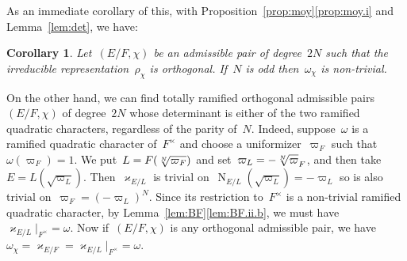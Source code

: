 \documentclass[12pt]{amsart}
\newcommand{\N}{\operatorname{N}}
\newtheorem{cor}[thm]{Corollary}
\newtheorem{cor}[equation]{Corollary}
\begin{document}
As an immediate corollary of this, with Proposition~\ref{prop:moy}\ref{prop:moy.i} and Lemma~\ref{lem:det}, we have:

\begin{cor}\label{cor:oddO}
Let~$(E/F,\chi)$ be an admissible pair of degree~$2N$ such that the irreducible representation~$\rho_\chi$ is orthogonal. If~$N$ is odd then~$\omega_\chi$ is non-trivial. 
\end{cor}

On the other hand, we can find totally ramified orthogonal admissible pairs~$(E/F,\chi)$ of degree~$2N$ whose determinant is either of the two ramified quadratic characters, regardless of the parity of~$N$. Indeed, suppose~$\omega$ is a ramified quadratic character of~$F^{\times}$ and choose a uniformizer~$\varpi_F$ such that~$\omega(\varpi_F)=1$. We put~$L=F(\root N\of{\varpi_F})$ and set~$\varpi_L=-\root N\of \varpi_F$, and then take~$E=L(\sqrt{\varpi_L})$. Then~$\varkappa_{E/L}$ is trivial on~$\N_{E/L}(\sqrt{\varpi_L})=-\varpi_L$ so is also trivial on~$\varpi_F=(-\varpi_L)^N$. Since its restriction to~$F^\times$ is a non-trivial ramified quadratic character, by Lemma~\ref{lem:BF}\ref{lem:BF.ii.b}, we must have~$\varkappa_{E/L}|_{F^\times}=\omega$. Now if~$(E/F,\chi)$ is any orthogonal admissible pair, we have~$\omega_\chi=\varkappa_{E/F}=\varkappa_{E/L}|_{F^\times}=\omega$.

\end{document}
